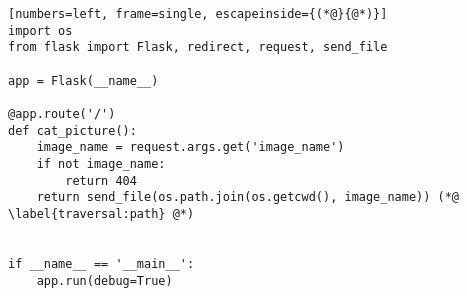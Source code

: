 \begin{lstlisting}[numbers=left, frame=single, escapeinside={(*@}{@*)}]
import os
from flask import Flask, redirect, request, send_file

app = Flask(__name__)

@app.route('/')
def cat_picture():
    image_name = request.args.get('image_name')
    if not image_name:
        return 404
    return send_file(os.path.join(os.getcwd(), image_name)) (*@ \label{traversal:path} @*)


if __name__ == '__main__':
    app.run(debug=True)
\end{lstlisting}
